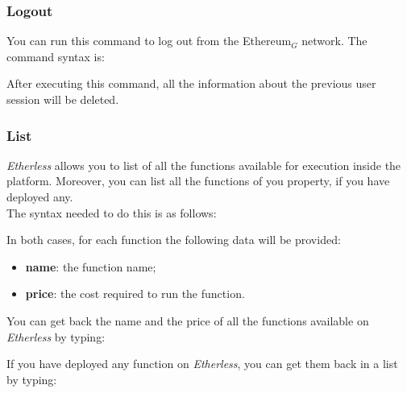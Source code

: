 \subsubsection{Logout}
You can run this command to log out from the Ethereum$_{G}$ network. The command syntax is:
\begin{center}
\end{center}
After executing this command, all the information about the previous user session will be deleted.

\subsubsection{List}\label{list}
\textit{Etherless} allows you to list of all the functions available for execution inside the platform. Moreover, you can list all the functions of you property, if you have deployed any. \\
The syntax needed to do this is as follows:
\begin{center}
\end{center}
\noindent In both cases, for each function the following data will be provided:
\begin{itemize}
	\item \textbf{name}: the function name;
	\item \textbf{price}: the cost required to run the function.
\end{itemize}

You can get back the name and the price of all the functions available on \textit{Etherless} by typing:
\begin{center}
\end{center}

If you have deployed any function on \textit{Etherless}, you can get them back in a list by typing:
\begin{center}
\end{center}

